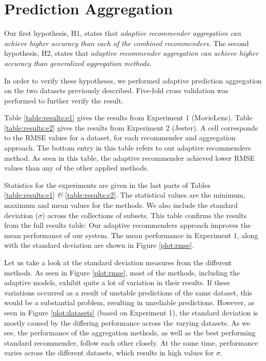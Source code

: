 \section{Prediction Aggregation}





Our first hypothesis, H1, states that
{
  \itshape
  adaptive recommender aggregation can achieve higher accuracy
  than each of the combined recommenders.
}
The second hypothesis, H2, states that
{
  \itshape
  adaptive recommender aggregation can achieve higher accuracy than generalized aggregation methods.
}

In order to verify these hypotheses, we performed adaptive prediction aggregation on the two datasets previously described.
Five-fold cross validation was performed to further verify the result.

Table \ref{table:results:e1} gives the results from Experiment 1 (MovieLens).
Table \ref{table:results:e2} gives the results from Experiment 2 (Jester).
A cell corresponds to the RMSE values for a dataset,
for each recommender and aggregation approach.
The bottom entry in this table refers to our adaptive recommenders method.
As seen in this table, the adaptive recommender achieved
lower RMSE values than any of the other applied methods.

Statistics for the experiments are given in the last
parts of Tables \ref{table:results:e1} \emph{\&} \ref{table:results:e2}. 
The statistical values are the minimum, maximum and mean values
for the methods. We also include
the standard deviation ($\sigma$)
across the collections of subsets.
This table confirms the results from the full results table:
Our adaptive recommenders approach improves the mean performance
of our system.
The mean performance in Experiment 1, along with the standard deviation
are shown in Figure \ref{plot:rmse}.


%



Let us take a look at the standard deviation measures from the different methods.
As seen in Figure \ref{plot:rmse}, 
most of the methods, including the adaptive models,
exhibit quite a lot of variation in their results.
If these variations occurred as a result of unstable
predictions of the same dataset, this would be a substantial problem,
resulting in unreliable predictions.
However, as seen in Figure \ref{plot:datasets}
(based on Experiment 1),
the standard deviation is mostly caused by the differing
performance across the varying datasets.
As we see, the performance of the aggregation methods,
as well as the best performing standard recommender,
follow each other closely. At the same time,
performance varies across the different datasets,
which results in high values for $\sigma$.

